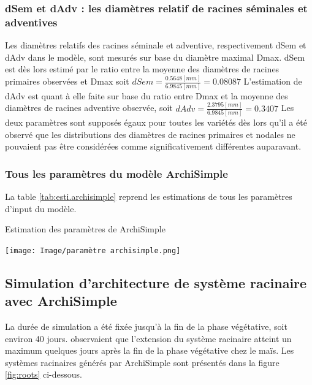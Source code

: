 \subsubsection{dSem et dAdv : les diamètres relatif de racines séminales et adventives}

Les diamètres relatifs des racines séminale et adventive, respectivement dSem et dAdv dans le modèle, sont mesurés sur base du diamètre maximal Dmax.
dSem est dès lors estimé par le ratio entre la moyenne des diamètres de racines primaires observées et Dmax soit $dSem=\frac{0.5648[mm]}{6.9845[mm]} = 0.08087$
L'estimation de dAdv est quant à elle faite sur base du ratio entre Dmax et la moyenne des diamètres de racines adventive observée, soit $dAdv = \frac{2.3795[mm]}{6.9845[mm]} = 0.3407$
Les deux paramètres sont supposés égaux pour toutes les variétés dès lors qu'il a été observé que les distributions des diamètres de racines primaires et nodales ne pouvaient pas être considérées comme significativement différentes auparavant.

\subsubsection{Tous les paramètres du modèle ArchiSimple}

La table \ref{tab:esti.archisimple} reprend les estimations de tous les paramètres d'input du modèle.

\begin{table}[ht]
    \centering
    \caption{Estimation des paramètres de ArchiSimple}
    \texttt{[image: Image/paramètre archisimple.png]}
    \label{tab:esti.archisimple}
\end{table}

\subsection{Simulation d'architecture de système racinaire avec ArchiSimple}

La durée de simulation a été fixée jusqu'à la fin de la phase végétative, soit environ 40 jours.
\cite{pellerinand_evaluation_1994} observaient que l'extension du système racinaire atteint un maximum quelques jours après la fin de la phase végétative chez le maïs.
Les systèmes racinaires générés par ArchiSimple sont présentés dans la figure \ref{fig:roots} ci-dessous.
\newpage

